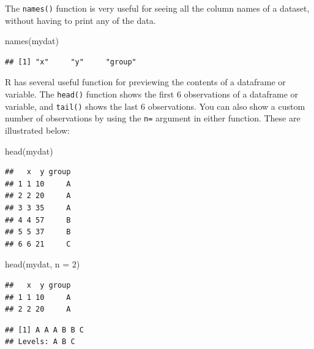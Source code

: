 \documentclass[
]{book}
\newenvironment{Shaded}{\begin{snugshade}}{\end{snugshade}}
\newcommand{\AttributeTok}[1]{\textcolor[rgb]{0.77,0.63,0.00}{#1}}
\newcommand{\DecValTok}[1]{\textcolor[rgb]{0.00,0.00,0.81}{#1}}
\newcommand{\FunctionTok}[1]{\textcolor[rgb]{0.00,0.00,0.00}{#1}}
\newcommand{\NormalTok}[1]{#1}
\newcommand{\SpecialCharTok}[1]{\textcolor[rgb]{0.00,0.00,0.00}{#1}}
\begin{document}
The \texttt{names()} function is very useful for seeing all the column names of
a dataset, without having to print any of the data.

\begin{Shaded}
\begin{Highlighting}[]
\FunctionTok{names}\NormalTok{(mydat)}
\end{Highlighting}
\end{Shaded}

\begin{verbatim}
## [1] "x"     "y"     "group"
\end{verbatim}

R has several useful function for previewing the contents of a dataframe
or variable. The \texttt{head()} function shows the first 6 observations of a
dataframe or variable, and \texttt{tail()} shows the last 6 observations. You
can also show a custom number of observations by using the \texttt{n=} argument
in either function. These are illustrated below:

\begin{Shaded}
\begin{Highlighting}[]
\FunctionTok{head}\NormalTok{(mydat)}
\end{Highlighting}
\end{Shaded}

\begin{verbatim}
##   x  y group
## 1 1 10     A
## 2 2 20     A
## 3 3 35     A
## 4 4 57     B
## 5 5 37     B
## 6 6 21     C
\end{verbatim}

\begin{Shaded}
\begin{Highlighting}[]
\FunctionTok{head}\NormalTok{(mydat, }\AttributeTok{n =} \DecValTok{2}\NormalTok{)}
\end{Highlighting}
\end{Shaded}

\begin{verbatim}
##   x  y group
## 1 1 10     A
## 2 2 20     A
\end{verbatim}

\begin{Shaded}
\end{Shaded}

\begin{verbatim}
## [1] A A A B B C
## Levels: A B C
\end{verbatim}
\end{document}
